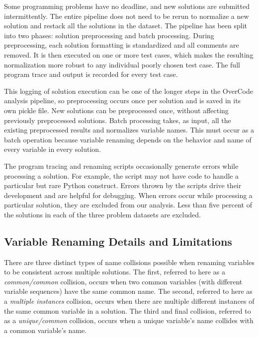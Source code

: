 Some programming problems have no deadline, and new solutions are submitted intermittently. The entire pipeline does not need to be rerun to normalize a new solution and restack all the solutions in the dataset. The pipeline has been split into two phases: solution preprocessing and batch processing. During preprocessing, each solution formatting is standardized and all comments are removed. It is then executed on one or more test cases, which makes the resulting normalization more robust to any individual poorly chosen test case. The full program trace and output is recorded for every test case. 

This logging of solution execution can be one of the longer steps in the OverCode analysis pipeline, so preprocessing occurs once per solution and is saved in its own pickle file. New solutions can be preprocessed once, without affecting previously preprocessed solutions. Batch processing takes, as input, all the existing preprocessed results and normalizes variable names. This must occur as a batch operation because variable renaming depends on the behavior and name of every variable in every solution.

The program tracing \cite{pgbovineOPT} and renaming scripts occasionally generate errors while processing a solution. For example, the script may not have code to handle a particular but rare Python construct. Errors thrown by the scripts drive their development and are helpful for debugging. When errors occur while processing a particular solution, they are excluded from our analysis. Less than five percent of the solutions in each of the three problem datasets are excluded.

\subsection{Variable Renaming Details and Limitations} \label{repercussions}

There are three distinct types of name collisions possible when renaming variables to be consistent across multiple solutions. The first, referred to here as a {\it common/common} collision, occurs when two common variables (with different variable sequences) have the same common name. The second, referred to here as a {\it multiple instances} collision, occurs when there are multiple different instances of the same common variable in a solution. The third and final collision, referred to as a {\it unique/common} collision, occurs when a unique variable's name collides with a common variable's name.

